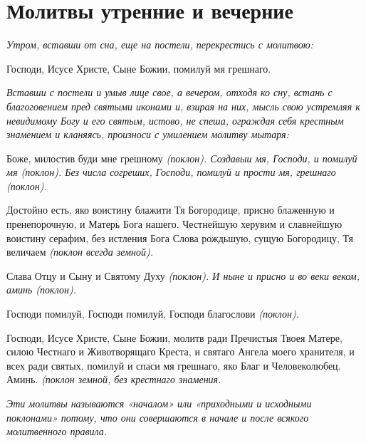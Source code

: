 


 


 

\section{Молитвы утренние и вечерние}
 


\itshape Утром, вставши от сна, еще на постели, перекрестись с молитвою:\normalfont{}


Господи, Исусе Христе, Сыне Божии, помилуй мя грешнаго.


\medskip


\itshape Вставши с постели и умыв лице свое, а вечером, отходя ко сну, встань с благоговением пред святыми иконами и, взирая на них, мысль свою устремляя к невидимому Богу и его святым, истово, не спеша, ограждая себя крестным знамением и кланяясь, произноси с умилением молитву мытаря:\normalfont{}


Боже, милостив буди мне грешному \itshape (поклон)\normalfont{}. Создавыи мя, Господи, и помилуй мя \itshape (поклон)\normalfont{}. Без числа согреших, Господи, помилуй и прости мя, грешнаго \itshape (поклон)\normalfont{}.


Достойно есть, яко воистину блажити Тя Богородице, присно блаженную и пренепорочную, и Матерь Бога нашего. Честнейшую херувим и славнейшую воистину серафим, без истления Бога Слова рождьшую, сущую Богородицу, Тя величаем \itshape (поклон всегда земной)\normalfont{}.


Слава Отцу и Сыну и Святому Духу \itshape (поклон)\normalfont{}. И ныне и присно и во веки веком, аминь \itshape (поклон)\normalfont{}.


Господи помилуй, Господи помилуй, Господи благослови \itshape (поклон)\normalfont{}. 


Господи, Исусе Христе, Сыне Божии, молитв ради Пречистыя Твоея Матере, силою Честнаго и Животворящаго Креста, и святаго Ангела моего хранителя, и всех ради святых, помилуй и спаси мя грешнаго, яко Благ и Человеколюбец. Аминь. \itshape (поклон земной, без крестнаго знамения\normalfont{}.


\medskip


\itshape Эти молитвы называются «началом» или «приходными и исходными поклонами» потому, что они совершаются в начале и после всякого молитвенного правила.\normalfont{}


